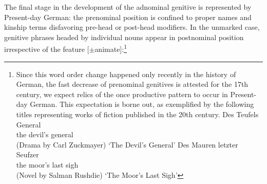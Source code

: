 \documentclass[output=paper
                ,modfonts
                ,nonflat
	        ,collection
	        ,collectionchapter
	        ,collectiontoclongg
 	        ,biblatex
                ,babelshorthands
                ,newtxmath
                ,draftmode
                ,colorlinks, citecolor=brown
]{./langsci/langscibook}
\begin{document}
The final stage in the development of the adnominal genitive is represented by Present-day German: the prenominal position is confined to proper names and kinship terms disfavoring pre-head or post-head modifiers. In the unmarked case, genitive phrases headed by individual nouns appear in postnominal position irrespective of the feature [$\pm$animate]:\footnote{Since this word order change happened only recently in the history of German, \ie the fast decrease of prenominal genitives is attested for the 17th century, we expect relics of the once productive pattern to occur in Present-day German. This expectation is borne out, as exemplified by the following titles representing works of fiction published in the 20th century.
\eal
\ex
\gll Des Teufels General \\ the devil's general \\ \hfill (Drama by Carl Zuckmayer)
\glt `The Devil's General'
\ex
\gll Des Mauren letzter Seufzer \\ the moor's last sigh  \\ \hfill (Novel by Salman Rushdie)
\glt  `The Moor's Last Sigh'  
\zl
}

\eal
{}
\zl

\eal
{}
\zl
\end{document}
